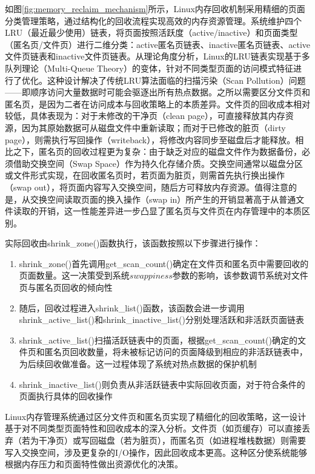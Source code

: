 如图\ref{fig:memory_reclaim_mechanism}所示，Linux内存回收机制采用精细的页面分类管理策略，通过结构化的回收流程实现高效的内存资源管理。系统维护四个LRU（最近最少使用）链表，将页面按照活跃度（active/inactive）和页面类型（匿名页/文件页）进行二维分类：active匿名页链表、inactive匿名页链表、active文件页链表和inactive文件页链表。从理论角度分析，Linux的LRU链表实现基于多队列理论（Multi-Queue Theory）的变体，针对不同类型页面的访问模式特征进行了优化。这种设计解决了传统LRU算法面临的扫描污染（Scan Pollution）问题——即顺序访问大量数据时可能会驱逐出所有热点数据。之所以需要区分文件页和匿名页，是因为二者在访问成本与回收策略上的本质差异。文件页的回收成本相对较低，具体表现为：对于未修改的干净页（clean page），可直接释放其内存资源，因为其原始数据可从磁盘文件中重新读取；而对于已修改的脏页（dirty page），则需执行写回操作（writeback），将修改内容同步至磁盘后才能释放。相比之下，匿名页的回收过程更为复杂：由于缺乏对应的磁盘文件作为数据备份，必须借助交换空间（Swap Space）作为持久化存储介质。交换空间通常以磁盘分区或文件形式实现，在回收匿名页时，若页面为脏页，则需首先执行换出操作（swap out），将页面内容写入交换空间，随后方可释放内存资源。值得注意的是，从交换空间读取页面的换入操作（swap in）所产生的开销显著高于从普通文件读取的开销，这一性能差异进一步凸显了匿名页与文件页在内存管理中的本质区别。

实际回收由shrink\_zone()函数执行，该函数按照以下步骤进行操作：

\begin{enumerate}
    \item shrink\_zone()首先调用get\_scan\_count()确定在文件页和匿名页中需要回收的页面数量。这一决策受到系统\(swappiness\)参数的影响，该参数调节系统对文件页与匿名页回收的倾向性
  
    \item 随后，回收过程进入shrink\_list()函数，该函数会进一步调用shrink\_active\_list()和shrink\_inactive\_list()分别处理活跃和非活跃页面链表
  
    \item shrink\_active\_list()扫描活跃链表中的页面，根据get\_scan\_count()确定的文件页和匿名页回收数量，将未被标记访问的页面降级到相应的非活跃链表中，为后续回收做准备。这一过程体现了系统对热点数据的保护机制
  
    \item shrink\_inactive\_list()则负责从非活跃链表中实际回收页面，对于符合条件的页面执行具体的回收操作
\end{enumerate}

Linux内存管理系统通过区分文件页和匿名页实现了精细化的回收策略，这一设计基于对不同类型页面特性和回收成本的深入分析。文件页（如页缓存）可以直接丢弃（若为干净页）或写回磁盘（若为脏页），而匿名页（如进程堆栈数据）则需要写入交换空间，涉及更复杂的I/O操作，因此回收成本更高。这种区分使系统能够根据内存压力和页面特性做出资源优化的决策。

